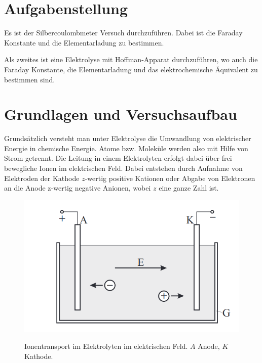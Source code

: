 \documentclass{article}
\begin{document}
\parindent0cm




\pagestyle{fancy}

\section{Aufgabenstellung}

Es ist der Silbercoulombmeter Versuch durchzuführen. Dabei ist die Faraday Konstante und die Elementarladung zu bestimmen. 

Als zweites ist eine Elektrolyse mit Hoffman-Apparat durchzuführen, wo auch die Faraday Konstante, die Elementarladung und das elektrochemische Äquivalent zu bestimmen sind.





\section{Grundlagen und Versuchsaufbau}

Grundsätzlich versteht man unter Elektrolyse die Umwandlung von elektrischer Energie in chemische Energie. Atome bzw. Moleküle werden also mit Hilfe von Strom getrennt. Die Leitung in einem Elektrolyten erfolgt dabei über frei bewegliche Ionen im elektrischen Feld. Dabei entstehen durch Aufnahme von Elektroden der Kathode $z$-wertig positive Kationen oder Abgabe von Elektronen an die Anode z-wertig negative Anionen, wobei $z$ eine ganze Zahl ist.



\begin{figure}[H]
\caption{Ionentransport im Elektrolyten im elektrischen Feld. $A$ Anode, $K$ Kathode.}
\label{fig:pic1}
{\centering
\includegraphics[scale=1.8]{pic1.png}}
\end{figure}
\end{document}
